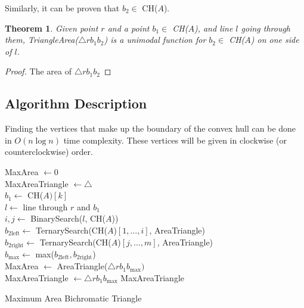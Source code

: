 \documentclass[a4paper]{article}
\newtheorem{theorem}{Theorem}
\begin{document}
    Similarly, it can be proven that $b_2 \in$ CH($A$).

    \vspace{0.5cm}
    \begin{theorem}
        Given point $r$ and a point $b_1 \in$ CH($A$), and line $l$ going through them, 
        TriangleArea($\triangle rb_1b_2$) is a unimodal function for $b_2 \in$ CH($A$) on one side of $l$.
    \end{theorem}

    \begin{proof}
        The area of $\triangle rb_1b_2$
    \end{proof}

    \subsection*{Algorithm Description}
    Finding the vertices that make up the boundary of the convex hull can be done in $O(n\log n)$ time complexity. 
    These vertices will be given in clockwise (or counterclockwise) order. 

    \begin{algorithm}[H]
    
        MaxArea $\gets 0$ \\
        MaxAreaTriangle $\gets \triangle$ \\
        {
            $b_1 \gets$ CH($A)[k]$ \\
            $l \gets$ line through $r$ and $b_1$ \\
            $i, j \gets$ BinarySearch($l$, CH($A$)) \\
            $b_{2\text{left}} \gets$ TernarySearch(CH($A$)$[1,...,i]$, AreaTriangle) \\
            $b_{2\text{right}} \gets$ TernarySearch(CH($A$)$[j,...,m]$, AreaTriangle) \\
            $b_{\text{max}} \gets$ max($b_{2\text{left}}, b_{2\text{right}}$) \\
            {
                MaxArea $\gets$ AreaTriangle($\triangle rb_1b_{\text{max}})$ \\ 
                MaxAreaTriangle $\gets \triangle rb_1b_{\text{max}}$ 
            }
        }
        \Return MaxAreaTriangle
        \caption{Maximum Area Bichromatic Triangle}
    \end{algorithm}
\end{document}
